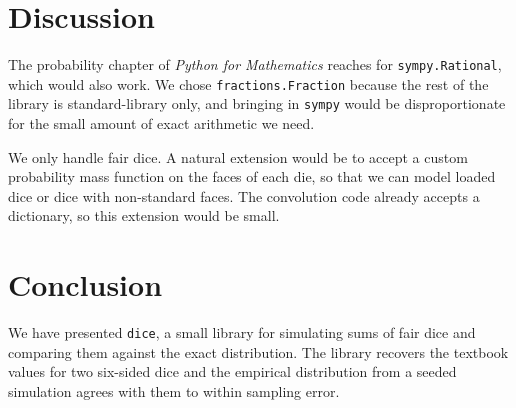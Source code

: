 \documentclass[11pt]{article}
\begin{document}
\section{Discussion}

The probability chapter of \emph{Python for Mathematics} reaches for
\texttt{sympy.Rational}, which would also work. We chose
\texttt{fractions.Fraction} because the rest of the library is
standard-library only, and bringing in \texttt{sympy} would be
disproportionate for the small amount of exact arithmetic we need.

We only handle fair dice. A natural extension
would be to accept a custom probability mass function on the faces of
each die, so that we can model loaded dice or dice with non-standard
faces. The convolution code already accepts a dictionary, so this
extension would be small.

\section{Conclusion}

We have presented \texttt{dice}, a small library for simulating sums
of fair dice and comparing them against the exact distribution. The
library recovers the textbook values for two six-sided dice and the
empirical distribution from a seeded simulation agrees with them to
within sampling error.



\end{document}
